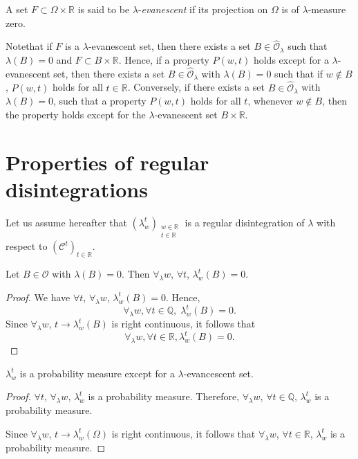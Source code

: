 \begin{defn}\label{part2:chap6:def85}
A set $F \subset \Omega \times \mathbb{R}$ is said to be
$\lambda$-{\em evanescent} if its projection on $\Omega$ is of
$\lambda$-measure zero. 
\end{defn}

Note\pageoriginale that if $F$ is a $\lambda$-evanescent set, then
there exists a set $B \in\hat{\mathscr{O}}_\lambda$ such that
$\lambda(B) =0$ and $F \subset B \times \mathbb{R}$. Hence, if a
property $P(w,t)$ holds except for a $\lambda$-evanescent set, then
there exists a set $B \in \hat{\mathscr{O}}_\lambda $ with $\lambda(B)
=0$ such that if $w \not\in B$, $P(w,t)$ holds for all  $t \in
\mathbb{R}$. Conversely, if there exists a set $B \in
\hat{\mathscr{O}}_\lambda$ with $\lambda(B)=0$, such that a property
$P(w,t)$ holds for all $t$, whenever $w \not\in B$, then the property
holds except for the $\lambda$-evanescent set $B \times \mathbb{R}$. 

\section{Properties of regular disintegrations}\label{part2:chap6:sec2}

Let us assume hereafter that $(\lambda^t_w)_{\substack{w\in
    \mathbb{R}\\t \in \mathbb{R}}}$ is a regular disintegration of
$\lambda$ with respect to $(\mathscr{C}^t)_{t \in \mathbb{R}}$. 

\begin{proposition}\label{part2:chap6:prop86}
Let $B \in \mathscr{O}$ with $\lambda(B) =0$. Then $\forall_\lambda
w$, $\forall t$, $\lambda^t_w(B)=0$. 
\end{proposition}

\begin{proof}
We have $\forall t$, $\forall_\lambda w$, $\lambda^t_w(B)=0$. Hence,
$$
\forall_\lambda w,\forall t \in \mathbb{Q}, \; \lambda^t_w(B)=0. 
$$
Since $\forall_\lambda w$, $t \to \lambda^t_w(B)$  is right
continuous, it follows that
$$
\forall_\lambda w, \forall t \in \mathbb{R}, \lambda^t_w(B) =0. 
$$
\end{proof}

\begin{proposition}\label{part2:chap6:prop87}
$\lambda^t_w$ is a probability measure except for a
  $\lambda$-evancescent set.
\end{proposition}

\begin{proof}
$\forall t$, $\forall_\lambda w$, $\lambda^t_w$ is a probability
  measure. Therefore, $\forall_\lambda w$, $\forall t \in
  \mathbb{Q}$, $\lambda^t_w$ is a probability measure. 

Since $\forall_\lambda w$, $t \to \lambda^t_w(\Omega)$ is right continuous, it follows that $\forall_\lambda w$, $\forall t \in \mathbb{R}$, $\lambda^t_w$ is a probability measure.
\end{proof}

